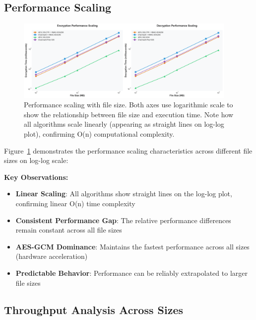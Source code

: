 \documentclass[12pt,a4paper]{article}
\begin{document}
\subsection{Performance Scaling}

\begin{figure}[h]
\centering
\includegraphics[width=0.95\textwidth]{performance_scaling.png}
\caption{Performance scaling with file size. Both axes use logarithmic scale to show the relationship between file size and execution time. Note how all algorithms scale linearly (appearing as straight lines on log-log plot), confirming O(n) computational complexity.}
\label{fig:scaling}
\end{figure}

Figure~\ref{fig:scaling} demonstrates the performance scaling characteristics across different file sizes on log-log scale:

\textbf{Key Observations:}
\begin{itemize}
    \item \textbf{Linear Scaling}: All algorithms show straight lines on the log-log plot, confirming linear O(n) time complexity
    \item \textbf{Consistent Performance Gap}: The relative performance differences remain constant across all file sizes
    \item \textbf{AES-GCM Dominance}: Maintains the fastest performance across all sizes (hardware acceleration)
    \item \textbf{Predictable Behavior}: Performance can be reliably extrapolated to larger file sizes
\end{itemize}

\subsection{Throughput Analysis Across Sizes}
\end{document}
